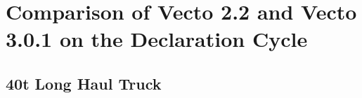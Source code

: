 



\section{Comparison of Vecto 2.2 and Vecto 3.0.1 on the Declaration Cycle} %
\label{sec:comparison_of_vecto_2_2_and_vecto_3_0_1_on_the_declaration_cycle}


\subsection{40t Long Haul Truck} %
\label{sub:40t_long_haul_truck}




